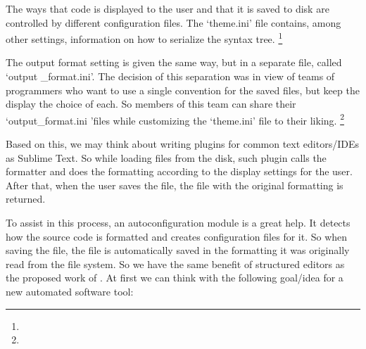 \begin{englishtext}
    \begin{citacao}
    The ways that code is displayed to the user and that it is saved to disk are
    controlled by different configuration files. The `theme.ini' file contains,
    among other settings, information on how to serialize the syntax tree.
    \cite[our translation]{structuredEditorStudy} \footnote{}
    \end{citacao}
    \begin{citacao}
    The output format setting is given the same way, but in a separate file,
    called `output \_format.ini'. The decision of this separation was in view of
    teams of programmers who want to use a single convention for the saved
    files, but keep the display the choice of each. So members of this team can
    share their `output\_format.ini 'files while customizing the `theme.ini'
    file to their liking. \cite[our translation]{structuredEditorStudy}
    \footnote{}
    \end{citacao}

    Based on this, we may think about writing plugins for common text
    editors/IDEs as Sublime Text. So while loading files from the disk, such
    plugin calls the formatter and does the formatting according to the display
    settings for the user. After that, when the user saves the file, the file
    with the original formatting is returned.

    To assist in this process, an autoconfiguration module is a great help. It
    detects how the source code is formatted and creates configuration files for
    it. So when saving the file, the file is automatically saved in the
    formatting it was originally read from the file system. So we have the same
    benefit of structured editors as the proposed work of
    \textcite{structuredEditorStudy}. At first we can think with the following
    goal/idea for a new automated software tool:


\end{englishtext}
